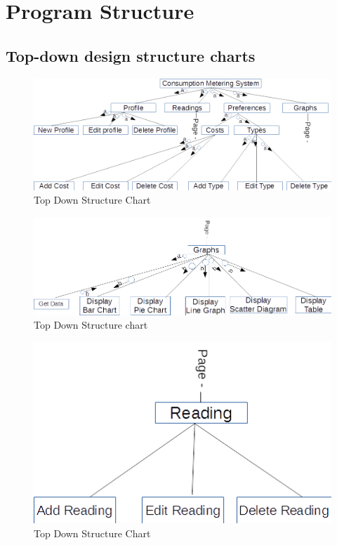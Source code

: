 \section{Program Structure}

\subsection{Top-down design structure charts}
\begin{landscape}
\begin{figure}[H]
\includegraphics{./design/structure chart 1.png}
\caption{Top Down Structure Chart}
\end{figure}
\end{landscape}

\begin{landscape}
\begin{figure}[H]
\includegraphics{./design/structure chart 2.png}
\caption {Top Down Structure chart}
\end{figure}
\end{landscape}

\begin{landscape}
\begin{figure}[H]
\includegraphics{./design/structure chart 3.png}
\caption{Top Down Structure Chart}
\end{figure}
\end{landscape}

